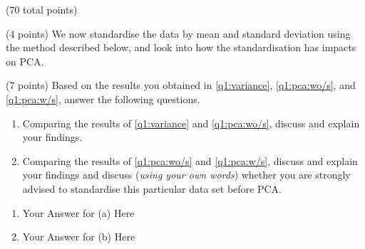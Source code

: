 \documentclass[12pt]{article}
\begin{document}
\begin{question}{(70 total points) \qOneTitle}
\begin{subquestion}{(4 points) %
    We now standardise the data by mean and standard deviation using the method described below, and look into how the standardisation has impacts on PCA.
  }
\end{subquestion}

\begin{subquestion}{(7 points)
    Based on the results you obtained in \ref{q1:variance}, \ref{q1:pca:wo/s}, and \ref{q1:pca:w/s}, answer the following questions.
  }
  \begin{enumerate}\NARROWITEM
  \item Comparing the results of \ref{q1:variance} and \ref{q1:pca:wo/s}, discuss and explain your findings.
  \item Comparing the results of \ref{q1:pca:wo/s} and \ref{q1:pca:w/s}, discuss and explain your findings and discuss ({\em using your own words}) whether you are strongly advised to standardise this particular data set before PCA.
  \end{enumerate}
   

  \begin{answerbox}{0.35\textheight}
    \begin{enumerate}
    \item Your Answer for (a) Here
    \item Your Answer for (b) Here
    \end{enumerate}
  \end{answerbox}
  

  
\end{subquestion}


\end{question}
\end{document}
